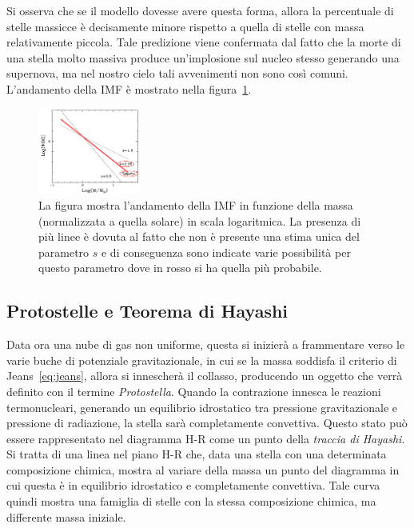 Si osserva che se il modello dovesse avere questa forma, allora la percentuale di stelle massicce è decisamente minore rispetto a quella di stelle con massa relativamente piccola. Tale predizione viene confermata dal fatto che la morte di una stella molto massiva produce un'implosione sul nucleo stesso generando una supernova, ma nel nostro cielo tali avvenimenti non sono così comuni. L'andamento della IMF è mostrato nella figura~\ref{fig:IMF}.

\begin{figure}
    \centering
    \includegraphics[width = 0.3\textwidth]{immagini/IMF.png}
    \caption{La figura mostra l'andamento della IMF in funzione della massa (normalizzata a quella solare) in scala logaritmica. La presenza di più linee è dovuta al fatto che non è presente una stima unica del parametro $s$ e di conseguenza sono indicate varie possibilità per questo parametro dove in rosso si ha quella più probabile.}\label{fig:IMF}
\end{figure}
\subsection{Protostelle e Teorema di Hayashi}

Data ora una nube di gas non uniforme, questa si inizierà a frammentare verso le varie buche di potenziale gravitazionale, in cui se la massa  soddisfa il criterio di Jeans~\eqref{eq:jeans}, allora si innescherà il collasso, producendo un oggetto che verrà definito con il termine \emph{Protostella}. Quando la contrazione innesca le reazioni termonucleari, generando un equilibrio idrostatico tra pressione gravitazionale e pressione di radiazione, la stella sarà completamente convettiva. Questo stato può essere rappresentato nel diagramma H-R come un punto della \emph{traccia di Hayashi}. Si tratta di una linea nel piano H-R che, data una stella con una determinata composizione chimica, mostra al variare della massa un punto del diagramma in cui questa è in equilibrio idrostatico e completamente convettiva. Tale curva quindi mostra una famiglia di stelle con la stessa composizione chimica, ma differente massa iniziale.

